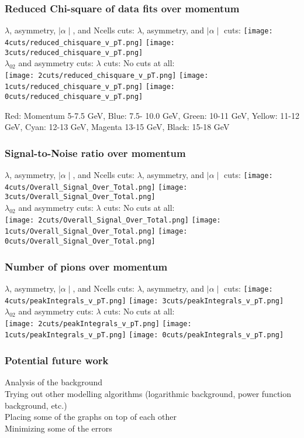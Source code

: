 \documentclass{beamer}
\begin{document}
\frame
{
\frametitle{Reduced Chi-square of data fits over momentum}
$\lambda$, asymmetry, $\mid\alpha\mid$, and Ncells cuts:
$\lambda$, asymmetry, and $\mid\alpha\mid$ cuts:
\texttt{[image: 4cuts/reduced\_chisquare\_v\_pT.png]}
\noindent\hspace{3 cm}\texttt{[image: 3cuts/reduced\_chisquare\_v\_pT.png]}\\
$\lambda_{02}$ and asymmetry cuts:
$\lambda$ cuts:
\noindent\hspace{2 cm} No cuts at all:\\
\texttt{[image: 2cuts/reduced\_chisquare\_v\_pT.png]}
\texttt{[image: 1cuts/reduced\_chisquare\_v\_pT.png]}
\texttt{[image: 0cuts/reduced\_chisquare\_v\_pT.png]}
}

\frame %
{
Red: Momentum 5-7.5 GeV, Blue: 7.5- 10.0 GeV, Green: 10-11 GeV, Yellow: 11-12 GeV, Cyan: 12-13 GeV, Magenta 13-15 GeV, Black: 15-18 GeV\\
\frametitle{Signal-to-Noise ratio over momentum}
$\lambda$, asymmetry, $\mid\alpha\mid$, and Ncells cuts:
$\lambda$, asymmetry, and $\mid\alpha\mid$ cuts:
\texttt{[image: 4cuts/Overall\_Signal\_Over\_Total.png]}
\noindent\hspace{3 cm}\texttt{[image: 3cuts/Overall\_Signal\_Over\_Total.png]}\\
$\lambda_{02}$ and asymmetry cuts:
$\lambda$ cuts:
\noindent\hspace{2 cm} No cuts at all:\\
\texttt{[image: 2cuts/Overall\_Signal\_Over\_Total.png]}
\texttt{[image: 1cuts/Overall\_Signal\_Over\_Total.png]}
\texttt{[image: 0cuts/Overall\_Signal\_Over\_Total.png]}
}

\frame %
{
\frametitle{Number of pions over momentum}
$\lambda$, asymmetry, $\mid\alpha\mid$, and Ncells cuts:
$\lambda$, asymmetry, and $\mid\alpha\mid$ cuts:
\texttt{[image: 4cuts/peakIntegrals\_v\_pT.png]}
\noindent\hspace{3 cm}\texttt{[image: 3cuts/peakIntegrals\_v\_pT.png]}\\
$\lambda_{02}$ and asymmetry cuts:
$\lambda$ cuts:
\noindent\hspace{2 cm} No cuts at all:\\
\texttt{[image: 2cuts/peakIntegrals\_v\_pT.png]}
\texttt{[image: 1cuts/peakIntegrals\_v\_pT.png]}
\texttt{[image: 0cuts/peakIntegrals\_v\_pT.png]}
}

\frame %
{
\frametitle{Potential future work}
Analysis of the background\\

Trying out other modelling algorithms (logarithmic background, power function background, etc.)\\

Placing some of the graphs on top of each other\\

Minimizing some of the errors\\
}
\end{document}
